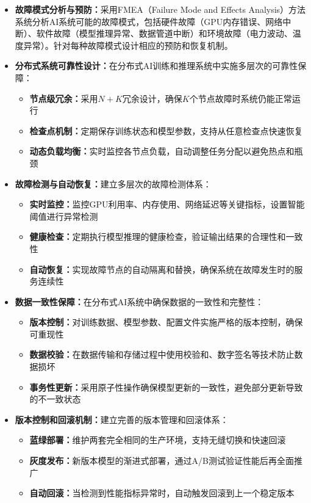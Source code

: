 \begin{itemize}
\item \textbf{故障模式分析与预防：}采用FMEA（Failure Mode and Effects Analysis）方法系统分析AI系统可能的故障模式，包括硬件故障（GPU内存错误、网络中断）、软件故障（模型推理异常、数据管道中断）和环境故障（电力波动、温度异常）。针对每种故障模式设计相应的预防和恢复机制。

\item \textbf{分布式系统可靠性设计：}在分布式AI训练和推理系统中实施多层次的可靠性保障：
\begin{itemize}
\item \textbf{节点级冗余：}采用$N+K$冗余设计，确保$K$个节点故障时系统仍能正常运行
\item \textbf{检查点机制：}定期保存训练状态和模型参数，支持从任意检查点快速恢复
\item \textbf{动态负载均衡：}实时监控各节点负载，自动调整任务分配以避免热点和瓶颈
\end{itemize}

\item \textbf{故障检测与自动恢复：}建立多层次的故障检测体系：
\begin{itemize}
\item \textbf{实时监控：}监控GPU利用率、内存使用、网络延迟等关键指标，设置智能阈值进行异常检测
\item \textbf{健康检查：}定期执行模型推理的健康检查，验证输出结果的合理性和一致性
\item \textbf{自动恢复：}实现故障节点的自动隔离和替换，确保系统在故障发生时的服务连续性
\end{itemize}

\item \textbf{数据一致性保障：}在分布式AI系统中确保数据的一致性和完整性：
\begin{itemize}
\item \textbf{版本控制：}对训练数据、模型参数、配置文件实施严格的版本控制，确保可重现性
\item \textbf{数据校验：}在数据传输和存储过程中使用校验和、数字签名等技术防止数据损坏
\item \textbf{事务性更新：}采用原子性操作确保模型更新的一致性，避免部分更新导致的不一致状态
\end{itemize}

\item \textbf{版本控制和回滚机制：}建立完善的版本管理和回滚体系：
\begin{itemize}
\item \textbf{蓝绿部署：}维护两套完全相同的生产环境，支持无缝切换和快速回滚
\item \textbf{灰度发布：}新版本模型的渐进式部署，通过A/B测试验证性能后再全面推广
\item \textbf{自动回滚：}当检测到性能指标异常时，自动触发回滚到上一个稳定版本
\end{itemize}


\end{itemize}

